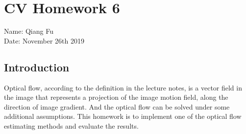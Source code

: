 \documentclass{article}
\begin{document}
\section*{CV Homework 6}{}
Name: Qiang Fu
\\Date: November 26th 2019

\subsection*{Introduction} 
\par
Optical flow, according to the definition in the lecture notes, is a vector field in the image that represents a projection of the image motion field, along the direction of image gradient\cite{ref1}. And the optical flow can be solved under some additional assumptions. This homework is to implement one of the optical flow estimating methods and evaluate the results.
\end{document}
